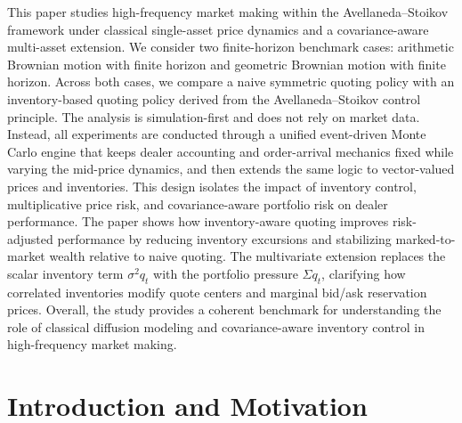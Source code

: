 \documentclass[a4paper,10pt,titlepage,oneside,openany]{book}
\theoremstyle{plain}\newtheorem{theorem}{Theorem}[chapter]
\theoremstyle{definition}\newtheorem{definition}{Definition}[chapter]
\theoremstyle{remark}\newtheorem{remark}{Remark}[chapter]
\newenvironment{tightabstract}[1][0.88]{%
  \begin{center}
  \begin{tcolorbox}[title={Abstract}, width=#1\textwidth, left=5mm, right=5mm,
    colback=white, boxrule=0.4pt]
  \small\justifying
}{%
  \end{tcolorbox}
  \end{center}
}
\begin{document}
\begin{titlepage}
\begin{center}
\vspace{1cm}
\begin{tightabstract}
This paper studies high-frequency market making within the Avellaneda--Stoikov framework under classical single-asset price dynamics and a covariance-aware multi-asset extension. We consider two finite-horizon benchmark cases: arithmetic Brownian motion with finite horizon and geometric Brownian motion with finite horizon. Across both cases, we compare a naive symmetric quoting policy with an inventory-based quoting policy derived from the Avellaneda--Stoikov control principle. The analysis is simulation-first and does not rely on market data. Instead, all experiments are conducted through a unified event-driven Monte Carlo engine that keeps dealer accounting and order-arrival mechanics fixed while varying the mid-price dynamics, and then extends the same logic to vector-valued prices and inventories. This design isolates the impact of inventory control, multiplicative price risk, and covariance-aware portfolio risk on dealer performance. The paper shows how inventory-aware quoting improves risk-adjusted performance by reducing inventory excursions and stabilizing marked-to-market wealth relative to naive quoting. The multivariate extension replaces the scalar inventory term $\sigma^2 q_t$ with the portfolio pressure $\Sigma q_t$, clarifying how correlated inventories modify quote centers and marginal bid/ask reservation prices. Overall, the study provides a coherent benchmark for understanding the role of classical diffusion modeling and covariance-aware inventory control in high-frequency market making.
\end{tightabstract}
\end{center}
\end{titlepage}

\frontmatter
\clearpage
{}
\setcounter{page}{1} %
\tableofcontents
\thispagestyle{plain}

\mainmatter
\clearpage
\setcounter{page}{1}


\chapter*{Introduction and Motivation}
\end{document}
